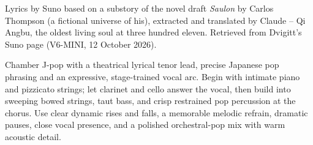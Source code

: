 
\begin{notes}
Lyrics by Suno based on a substory of the novel draft \emph{Saulon} by Carlos Thompson (a fictional universe of his), extracted and translated by Claude -- Qi Angbu, the oldest living soul at three hundred eleven. Retrieved from Dvigitt's Suno page (V6-MINI, 12 October 2026).
\end{notes}
\begin{style}
Chamber J-pop with a theatrical lyrical tenor lead, precise Japanese pop phrasing and an expressive, stage-trained vocal arc. Begin with intimate piano and pizzicato strings; let clarinet and cello answer the vocal, then build into sweeping bowed strings, taut bass, and crisp restrained pop percussion at the chorus. Use clear dynamic rises and falls, a memorable melodic refrain, dramatic pauses, close vocal presence, and a polished orchestral-pop mix with warm acoustic detail.
\end{style}
